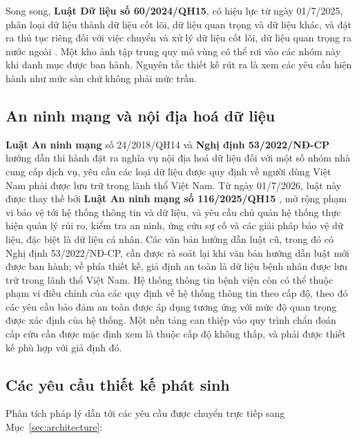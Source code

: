 Song song, \textbf{Luật Dữ liệu số 60/2024/QH15}, có hiệu lực từ ngày 01/7/2025,
phân loại dữ liệu thành dữ liệu cốt lõi, dữ liệu quan trọng và dữ liệu khác, và đặt
ra thủ tục riêng đối với việc chuyển và xử lý dữ liệu cốt lõi, dữ liệu quan trọng ra
nước ngoài \cite{datalaw2024}. Một kho ảnh tập trung quy mô vùng có thể rơi vào các
nhóm này khi danh mục được ban hành. Nguyên tắc thiết kế rút ra là xem các yêu cầu
hiện hành như mức sàn chứ không phải mức trần.

\subsection{An ninh mạng và nội địa hoá dữ liệu}

\textbf{Luật An ninh mạng} số 24/2018/QH14 \cite{cybersecuritylaw} và
\textbf{Nghị định 53/2022/NĐ-CP} hướng dẫn thi hành \cite{decree53} đặt ra nghĩa vụ
nội địa hoá dữ liệu đối với một số nhóm nhà cung cấp dịch vụ, yêu cầu các loại dữ
liệu được quy định về người dùng Việt Nam phải được lưu trữ trong lãnh thổ Việt Nam.
Từ ngày 01/7/2026, luật này được thay thế bởi \textbf{Luật An ninh mạng số
116/2025/QH15} \cite{cybersecuritylaw2025}, mở rộng phạm vi bảo vệ tới hệ thống
thông tin và dữ liệu, và yêu cầu chủ quản hệ thống thực hiện quản lý rủi ro, kiểm
tra an ninh, ứng cứu sự cố và các giải pháp bảo vệ dữ liệu, đặc biệt là dữ liệu cá
nhân. Các văn bản hướng dẫn luật cũ, trong đó có Nghị định 53/2022/NĐ-CP, cần được
rà soát lại khi văn bản hướng dẫn luật mới được ban hành; về phía thiết kế, giả định
an toàn là dữ liệu bệnh nhân được lưu trữ trong lãnh thổ Việt Nam. Hệ thống
thông tin bệnh viện còn có thể thuộc phạm vi điều chỉnh của các quy định về hệ
thống thông tin theo cấp độ, theo đó các yêu cầu bảo đảm an toàn được áp dụng
tương ứng với mức độ quan trọng được xác định của hệ thống. Một nền tảng can
thiệp vào quy trình chẩn đoán cấp cứu cần được mặc định xem là thuộc cấp độ
không thấp, và phải được thiết kế phù hợp với giả định đó.

\subsection{Các yêu cầu thiết kế phát sinh}

Phân tích pháp lý dẫn tới các yêu cầu được chuyển trực tiếp sang
Mục~\ref{sec:architecture}:

